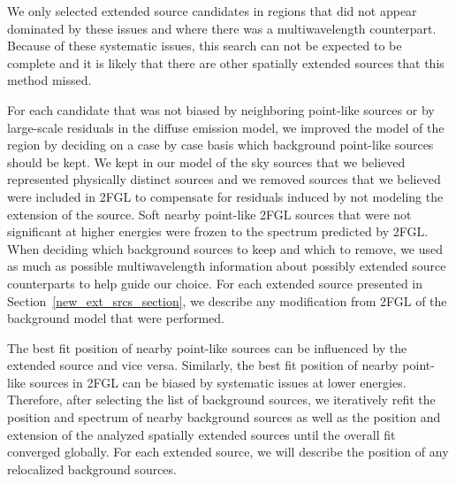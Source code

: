 \documentclass[12pt,preprint]{aastex}
\begin{document}
We only selected extended source
candidates in regions that did not appear dominated by these issues and
where there was a multiwavelength
counterpart. Because of these systematic issues, this search can not be
expected to be complete and it is likely that there are other spatially
extended sources that this method missed.

For each candidate that was not biased by neighboring point-like
sources or by large-scale residuals in the diffuse emission model, we
improved the model of the region by deciding on a case by case basis which
background point-like sources should be kept.  We kept in our model of the sky
sources that we
believed represented physically distinct sources and we removed 
sources that we believed were included in 2FGL to compensate
for residuals induced by not modeling the extension of the source.
Soft nearby point-like 2FGL sources that were not significant at higher energies
were frozen to the spectrum predicted by 2FGL.
When deciding
which background sources to keep and which to remove, we used as much as possible
multiwavelength information about possibly extended source counterparts
to help guide our choice. For each extended source presented in 
Section~\ref{new_ext_srcs_section}, we describe any modification from 2FGL
of the background model that were performed.

The best fit position of nearby point-like sources can be influenced by
the extended source and vice versa.  Similarly,
the best fit position of nearby point-like sources in 2FGL can be biased
by systematic issues at lower energies.
Therefore, after selecting the list of background sources, we iteratively
refit the position and spectrum of nearby background sources as well as
the position and extension of the analyzed spatially extended
sources until the overall fit converged globally.  For each extended
source, we will describe the position of any relocalized background
sources.
\end{document}
